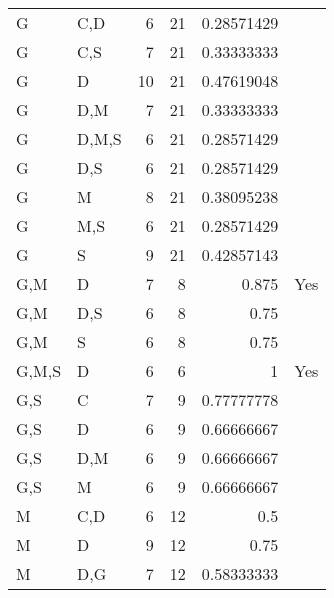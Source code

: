 \documentclass[10pt]{article}
\begin{document}
\begin{table}[htb]
\begin{center}
\begin{tabular}{llrrrl}
 G      &  C,D    &          6  &         21  &             0.28571429  &                \\
 G      &  C,S    &          7  &         21  &             0.33333333  &                \\
 G      &  D      &         10  &         21  &             0.47619048  &                \\
 G      &  D,M    &          7  &         21  &             0.33333333  &                \\
 G      &  D,M,S  &          6  &         21  &             0.28571429  &                \\
 G      &  D,S    &          6  &         21  &             0.28571429  &                \\
 G      &  M      &          8  &         21  &             0.38095238  &                \\
 G      &  M,S    &          6  &         21  &             0.28571429  &                \\
 G      &  S      &          9  &         21  &             0.42857143  &                \\
 G,M    &  D      &          7  &          8  &                  0.875  &  Yes           \\
 G,M    &  D,S    &          6  &          8  &                   0.75  &                \\
 G,M    &  S      &          6  &          8  &                   0.75  &                \\
 G,M,S  &  D      &          6  &          6  &                      1  &  Yes           \\
 G,S    &  C      &          7  &          9  &             0.77777778  &                \\
 G,S    &  D      &          6  &          9  &             0.66666667  &                \\
 G,S    &  D,M    &          6  &          9  &             0.66666667  &                \\
 G,S    &  M      &          6  &          9  &             0.66666667  &                \\
 M      &  C,D    &          6  &         12  &                    0.5  &                \\
 M      &  D      &          9  &         12  &                   0.75  &                \\
 M      &  D,G    &          7  &         12  &             0.58333333  &                \\

\end{tabular}
\end{center}
\end{table}
\end{document}
